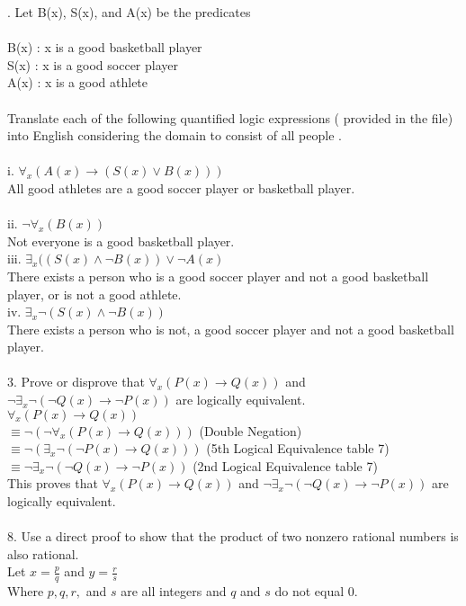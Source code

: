 \documentclass[11pt, oneside]{article}   	%
\begin{document}
. Let B(x), S(x), and A(x) be the predicates \\\\
B(x) : x is a good basketball player\\
S(x) : x is a good soccer player\\
A(x) : x is a good athlete\\\\
Translate each of the following quantified logic expressions ( provided in the file)  into English considering the domain to consist of all people .\\\\
i. $\forall _x (A(x)\to (S(x)\lor B(x)))$\\
All good athletes are a good soccer player or basketball player. \\\\
ii. $\neg\forall _x(B(x))$\\
Not everyone is a good basketball player.\\ 
iii. $\exists _x((S(x)\wedge\neg B(x))\lor\neg A(x)$\\
There exists a person who is a good soccer player and not a good basketball player, or is not a good athlete. \\
iv. $\exists _x\neg (S(x)\wedge\neg B(x))$\\
There exists a person who is not, a good soccer player and not a good basketball player. \\\\
3. Prove or disprove that $\forall _x(P(x)\to Q(x)) $ and $ \neg\exists _x\neg(\neg Q(x)\to\neg P(x))$ are logically equivalent.\\
$\forall _x(P(x)\to Q(x)) $ \\
$\equiv\neg (\neg\forall _x(P(x)\to Q(x)))$ (Double Negation)\\
$\equiv\neg (\exists _x\neg(\neg P(x)\to Q(x)))$ (5th Logical Equivalence table 7)\\
$\equiv\neg\exists _x\neg(\neg Q(x)\to\neg P(x))$ (2nd Logical Equivalence table 7)\\
This proves that $\forall _x(P(x)\to Q(x)) $ and $ \neg\exists _x\neg(\neg Q(x)\to\neg P(x))$ are logically equivalent. \\\\
8. Use a direct proof to show that the product of  two nonzero rational numbers is also rational.\\
Let $x = \frac {p}{q}$ and $y = \frac {r}{s}$\\
Where $p, q, r,$ and $s$ are all integers and $q$ and $s$ do not equal 0. \\
\end{document}
